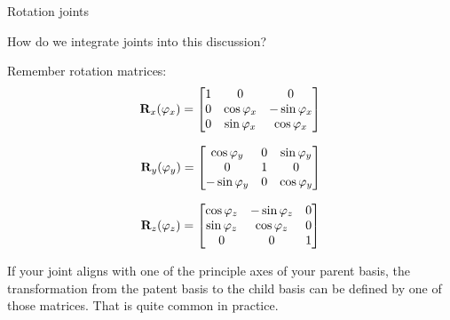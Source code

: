 \documentclass{beamer}
\begin{document}
\begin{frame}{Rotation joints}
	\begin{flushleft}
		
		How do we integrate joints into this discussion?
		
		\bigskip
		
		Remember rotation matrices:
		\begin{equation}
			\mathbf{R}_x (\varphi_x) = 
			\begin{bmatrix}
				1 & 0 & 0 \\
				0 & \cos \varphi_x & -\sin \varphi_x \\
				0 & \sin \varphi_x & \cos \varphi_x 
			\end{bmatrix}
		\end{equation}
	
	\begin{equation}
	\mathbf{R}_y (\varphi_y) = 
	\begin{bmatrix}
		\cos \varphi_y & 0 & \sin \varphi_y \\
		0 & 1 & 0 \\
		-\sin \varphi_y & 0 & \cos \varphi_y
	\end{bmatrix}
\end{equation}

\begin{equation}
	\mathbf{R}_z (\varphi_z) = 
	\begin{bmatrix}
		\cos \varphi_z & -\sin \varphi_z & 0 \\
		\sin \varphi_z & \cos \varphi_z & 0 \\
		0 & 0 & 1
	\end{bmatrix}
\end{equation}

If your joint aligns with one of the principle axes of your parent basis, the transformation from the patent basis to the child basis can be defined by one of those matrices. That is quite common in practice.
		
	\end{flushleft}
\end{frame}
\end{document}
